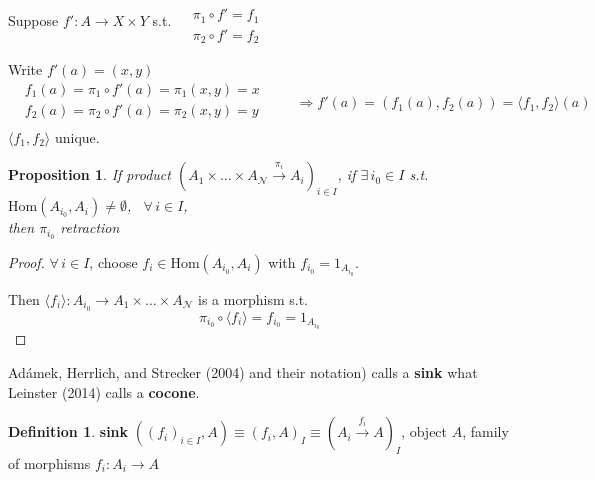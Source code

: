 \documentclass[twoside,landscape,10pt]{amsart}
\theoremstyle{plain}
\newtheorem{proposition}{Proposition}
\theoremstyle{definition}
\newtheorem{definition}{Definition}
\theoremstyle{remark}
\begin{document}
\begin{multicols*}{2}
Suppose $f': A \to X\times Y$ s.t. $\begin{aligned} & \quad \\
  & \pi_1 \circ f' = f_1 \\
  & \pi_2 \circ f' = f_2 \end{aligned}$

Write $f'(a) = (x,y)$
\[
\begin{aligned}
  & f_1(a) = \pi_1 \circ f'(a) = \pi_1(x,y) =x \\ 
  & f_2(a) = \pi_2 \circ f'(a) = \pi_2(x,y) =y \\ 
\end{aligned} \qquad \, \Longrightarrow f'(a) = (f_1(a), f_2(a)) = \langle f_1, f_2 \rangle (a)
\]
$\langle f_1, f_2 \rangle $ unique.  

\begin{proposition}
  If product $(A_1 \times \dots \times A_{\mathcal{N}} \xrightarrow{ \pi_i } A_i )_{i\in I}$, if $\exists \,  i_0 \in I$ s.t. $\text{Hom}(A_{i_0}, A_i) \neq \emptyset$, \, $\forall \, i \in I$, \\
then $\pi_{i_0}$ \emph{retraction }
\end{proposition}

\begin{proof}
  $\forall \, i \in I$, choose $f_i \in \text{Hom}(A_{i_0}, A_i)$ with $f_{i_0} = 1_{A_{i_0}}$.  

Then $\langle f_i \rangle : A_{i_0} \to A_1 \times \dots \times A_{\mathcal{N}}$ is a morphism s.t. 
\[
\pi_{i_0} \circ \langle f_i \rangle = f_{i_0} = 1_{A_{i_0}}
\]
\end{proof}


Ad\'{a}mek, Herrlich, and Strecker (2004) \cite{AHS2004} and their notation) calls a \textbf{sink} what Leinster (2014) \cite{Lein2014} calls a \textbf{cocone}.  
\begin{definition}
\textbf{sink} $((f_i)_{i\in I}, A) \equiv (f_i , A)_I \equiv (A_i \xrightarrow{ f_i } A)_I$, object $A$, family of morphisms $f_i : A_i \to A$
\end{definition}




\end{multicols*}
\end{document}
